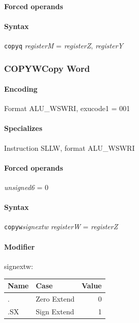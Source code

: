 {\paragraph{Forced operands} 

\paragraph{Syntax} \texttt{copyq} \emph{registerM} = \emph{registerZ}, \emph{registerY}
\newpage
\subsubsection[{\small COPYW: Copy Word}]{COPYW\hfill Copy Word}
\label{instr:COPYW}

\paragraph{Encoding} Format \textsf{ALU\_WSWRI, exucode1 = 001}\\



\paragraph{Specializes} Instruction SLLW, format ALU\_WSWRI

\paragraph{Forced operands} \emph{unsigned6} = 0

\paragraph{Syntax} \texttt{copyw}\emph{signextw} \emph{registerW} = \emph{registerZ}

\paragraph{Modifier} \textsf{signextw}:\\

\noindent \begin{tabular}{|l|l|r|} \hline
\bf{Name} & \bf{Case} & \bf{Value} \\ \hline
. & Zero Extend & 0 \\
.SX & Sign Extend & 1 \\
\hline \end{tabular}
\newpage
}

